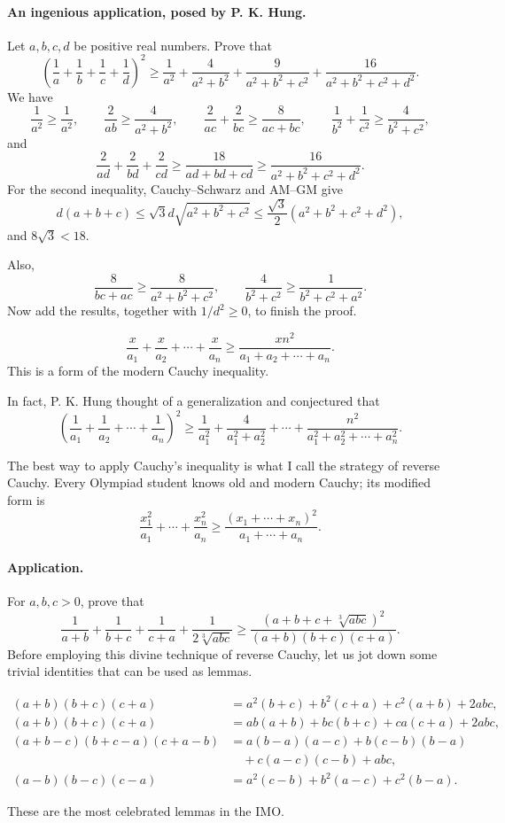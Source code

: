 \documentclass[11pt,a4paper]{article}
\begin{document}
\paragraph{An ingenious application, posed by P. K. Hung.}
Let $a,b,c,d$ be positive real numbers. Prove that
\[\left(\frac1a+\frac1b+\frac1c+\frac1d\right)^2
\geq\frac1{a^2}+\frac4{a^2+b^2}+\frac9{a^2+b^2+c^2}
+\frac{16}{a^2+b^2+c^2+d^2}.\]
We have
\[
\frac1{a^2}\geq\frac1{a^2},\qquad
\frac2{ab}\geq\frac4{a^2+b^2},\qquad
\frac2{ac}+\frac2{bc}\geq\frac8{ac+bc},\qquad
\frac1{b^2}+\frac1{c^2}\geq\frac4{b^2+c^2},
\]
and
\[\frac2{ad}+\frac2{bd}+\frac2{cd}
\geq\frac{18}{ad+bd+cd}\geq\frac{16}{a^2+b^2+c^2+d^2}.\]
For the second inequality, Cauchy--Schwarz and AM--GM give
\[
d(a+b+c)\leq\sqrt3d\sqrt{a^2+b^2+c^2}
\leq\frac{\sqrt3}{2}(a^2+b^2+c^2+d^2),
\]
and $8\sqrt3<18$.

Also,
\[\frac8{bc+ac}\geq\frac8{a^2+b^2+c^2},\qquad
\frac4{b^2+c^2}\geq\frac1{b^2+c^2+a^2}.\]
Now add the results, together with $1/d^2\geq0$, to finish the proof.
\setcounter{theorem}{75}\begin{corollary}
\[\frac x{a_1}+\frac x{a_2}+\cdots+\frac x{a_n}
\geq\frac{xn^2}{a_1+a_2+\cdots+a_n}.\]
This is a form of the modern Cauchy inequality.
\end{corollary}
In fact, P. K. Hung thought of a generalization and conjectured that
\[\left(\frac1{a_1}+\frac1{a_2}+\cdots+\frac1{a_n}\right)^2
\geq\frac1{a_1^2}+\frac4{a_1^2+a_2^2}+\cdots+
\frac{n^2}{a_1^2+a_2^2+\cdots+a_n^2}.\]

\begin{lemma}
The best way to apply Cauchy's inequality is what I call the strategy of reverse Cauchy.
Every Olympiad student knows old and modern Cauchy; its modified form is
\[
\frac{x_1^2}{a_1}+\cdots+\frac{x_n^2}{a_n}
\geq\frac{(x_1+\cdots+x_n)^2}{a_1+\cdots+a_n}.
\]
\end{lemma}
\paragraph{Application.}
For $a,b,c>0$, prove that
\[
\frac1{a+b}+\frac1{b+c}+\frac1{c+a}+\frac1{2\sqrt[3]{abc}}
\geq\frac{(a+b+c+\sqrt[3]{abc})^2}{(a+b)(b+c)(c+a)}.
\]
Before employing this divine technique of reverse Cauchy, let us jot down some trivial identities that can be used as lemmas.
\begin{lemma}\label{lemma:lb1-29}
\begin{align*}
(a+b)(b+c)(c+a)&=a^2(b+c)+b^2(c+a)+c^2(a+b)+2abc,\\
(a+b)(b+c)(c+a)&=ab(a+b)+bc(b+c)+ca(c+a)+2abc,\\
(a+b-c)(b+c-a)(c+a-b)
&=a(b-a)(a-c)+b(c-b)(b-a)\\
&\quad+c(a-c)(c-b)+abc,\\
(a-b)(b-c)(c-a)&=a^2(c-b)+b^2(a-c)+c^2(b-a).
\end{align*}
\end{lemma}
These are the most celebrated lemmas in the IMO.
\end{document}
